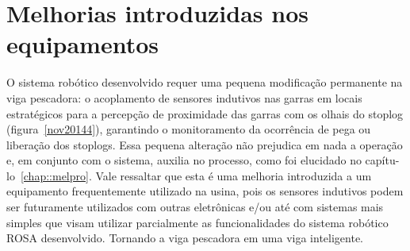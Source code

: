 \section{Melhorias introduzidas nos equipamentos}
O sistema robótico desenvolvido requer uma pequena modificação permanente na
viga pescadora: o acoplamento de sensores indutivos nas garras em locais
estratégicos para a percepção de proximidade das garras com os olhais do
stoplog (figura~\ref{nov20144}), garantindo o monitoramento da ocorrência de
pega ou liberação dos stoplogs. Essa pequena alteração não prejudica em nada a operação e, em
conjunto com o sistema, auxilia no processo, como foi elucidado no
capítu-\-lo~\ref{chap::melpro}. Vale ressaltar que esta é uma melhoria
introduzida a um equipamento frequentemente utilizado na usina, pois os sensores indutivos podem ser futuramente utilizados com outras eletrônicas e/ou
até com sistemas mais simples que visam utilizar parcialmente as
funcionalidades do sistema robótico ROSA desenvolvido. Tornando a viga
pescadora em uma viga inteligente.
